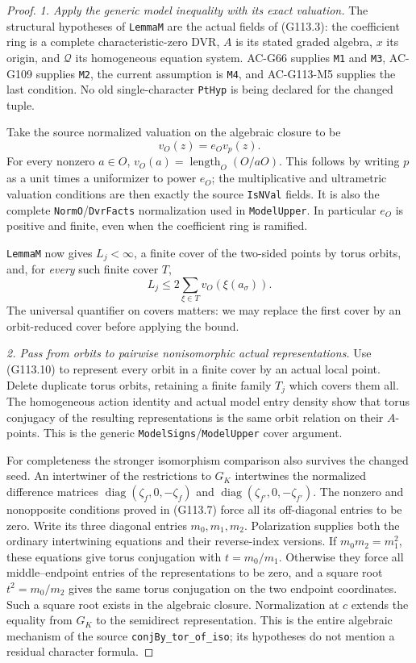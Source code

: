 \begin{proof}
\emph{1. Apply the generic model inequality with its exact valuation.}
The structural hypotheses of \texttt{LemmaM} are the actual fields
of (G113.3): the coefficient ring is a complete characteristic-zero
DVR, \(A\) is its stated graded algebra, \(x\) its origin, and
\(\mathcal Q\) its homogeneous equation system.  AC-G66 supplies
\texttt{M1} and \texttt{M3}, AC-G109 supplies \texttt{M2}, the
current assumption is \texttt{M4}, and AC-G113-M5 supplies the
last condition.  No old single-character \texttt{PtHyp} is being
declared for the changed tuple.

Take the source normalized valuation on the algebraic closure to be
\[
                         v_O(z)=e_O v_p(z).
 \tag{G113.16}
\]
For every nonzero \(a\in O\),
\(v_O(a)=\operatorname{length}_O(O/aO)\).  This follows by
writing \(p\) as a unit times a uniformizer to power \(e_O\);
the multiplicative and ultrametric valuation conditions are then
exactly the source \texttt{IsNVal} fields.  It is also the complete
\texttt{NormO}/\texttt{DvrFacts} normalization used in
\texttt{ModelUpper}.  In particular \(e_O\) is positive and
finite, even when the coefficient ring is ramified.

\texttt{LemmaM} now gives \(L_j<\infty\), a finite cover of
the two-sided points by torus orbits, and, for \emph{every} such
finite cover \(T\),
\[
                         L_j\le2\sum_{\xi\in T}v_O(\xi(a_\sigma)).
 \tag{G113.17}
\]
The universal quantifier on covers matters: we may replace the
first cover by an orbit-reduced cover before applying the bound.

\emph{2. Pass from orbits to pairwise nonisomorphic actual representations.}
Use (G113.10) to represent every orbit in a finite cover by an
actual local point.  Delete duplicate torus orbits, retaining a
finite family \(T_j\) which covers them all.  The homogeneous
action identity and actual model entry density show that torus
conjugacy of the resulting representations is the same orbit
relation on their \(A\)-points.  This is the generic
\texttt{ModelSigns}/\texttt{ModelUpper} cover argument.

For completeness the stronger isomorphism comparison also survives
the changed seed.  An intertwiner of the restrictions to \(G_K\)
intertwines the normalized difference matrices
\(\operatorname{diag}(\zeta_f,0,-\zeta_f)\) and
\(\operatorname{diag}(\zeta_{f'},0,-\zeta_{f'})\).
The nonzero and nonopposite conditions proved in (G113.7) force
all its off-diagonal entries to be zero.  Write its three diagonal
entries \(m_0,m_1,m_2\).  Polarization supplies both the ordinary
intertwining equations and their reverse-index versions.  If
\(m_0m_2=m_1^2\), these equations give torus conjugation with
\(t=m_0/m_1\).  Otherwise they force all middle--endpoint entries
of the representations to be zero, and a square root
\(t^2=m_0/m_2\) gives the same torus conjugation on the two
endpoint coordinates.  Such a square root exists in the algebraic
closure.  Normalization at \(c\) extends the equality from
\(G_K\) to the semidirect representation.  This is the entire
algebraic mechanism of the source \texttt{conjBy\_tor\_of\_iso};
its hypotheses do not mention a residual character formula.


\end{proof}
